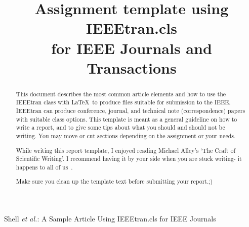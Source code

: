 \documentclass[conference]{IEEEtran}
\begin{document}
\title{Assignment template using IEEEtran.cls\\ for IEEE Journals and Transactions}

\author{
	\and
	\and
}
%
{Shell \MakeLowercase{\textit{et al.}}: A Sample Article Using IEEEtran.cls for IEEE Journals}


\maketitle

\begin{abstract}
	This document describes the most common article elements and how to use the IEEEtran class with \LaTeX\ to produce files suitable for submission to the IEEE. IEEEtran can produce conference, journal, and technical note (correspondence) papers with suitable class options.
	This template is meant as a general guideline on how to write a report, and to give some tips about what you should and should not be writing. You may move or cut sections depending on the assignment or your needs.

	While writing this report template, I enjoyed reading Michael Alley's `The Craft of Scientific Writing'. I recommend having it by your side when you are stuck writing- it happens to all of us~\cite{AlleyMichael2018TCoS}.

	Make sure you clean up the template text before submitting your report.;)
\end{abstract}
\end{document}
